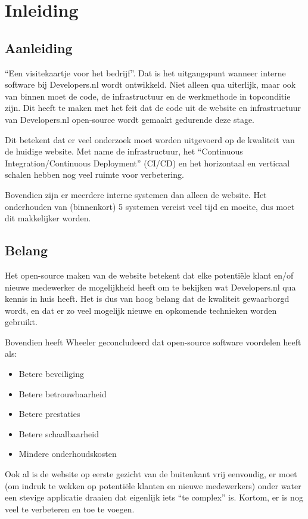 \chapter{Inleiding}

\label{Chapter1}


\section{Aanleiding}
\enquote{Een visitekaartje voor het bedrijf}. Dat is het uitgangspunt wanneer interne software bij Developers.nl wordt ontwikkeld. Niet alleen qua uiterlijk, maar ook van binnen moet de code, de infrastructuur en de werkmethode in topconditie zijn. Dit heeft te maken met het feit dat de code uit de website en infrastructuur van Developers.nl open-source wordt gemaakt gedurende deze stage.

Dit betekent dat er veel onderzoek moet worden uitgevoerd op de kwaliteit van de huidige website. Met name de infrastructuur, het \enquote{Continuous Integration/Continuous Deployment} (CI/CD) en het horizontaal en verticaal schalen hebben nog veel ruimte voor verbetering.

Bovendien zijn er meerdere interne systemen dan alleen de website. Het onderhouden van (binnenkort) 5 systemen vereist veel tijd en moeite, dus moet dit makkelijker worden.

\section{Belang}

Het open-source maken van de website betekent dat elke potentiële klant en/of nieuwe medewerker de mogelijkheid heeft om te bekijken wat Developers.nl qua kennis in huis heeft. Het is dus van hoog belang dat de kwaliteit gewaarborgd wordt, en dat er zo veel mogelijk nieuwe en opkomende technieken worden gebruikt.

Bovendien heeft Wheeler \parencite{WhyOpenSource} geconcludeerd dat open-source software voordelen heeft als:
\begin{itemize}
	\item Betere beveiliging
	\item Betere betrouwbaarheid 
	\item Betere prestaties
	\item Betere schaalbaarheid
	\item Mindere onderhoudskosten
\end{itemize}
Ook al is de website op eerste gezicht van de buitenkant vrij eenvoudig, er moet (om indruk te wekken op potentiële klanten en nieuwe medewerkers) onder water een stevige applicatie draaien dat eigenlijk iets \enquote{te complex} is. Kortom, er is nog veel te verbeteren en toe te voegen.


